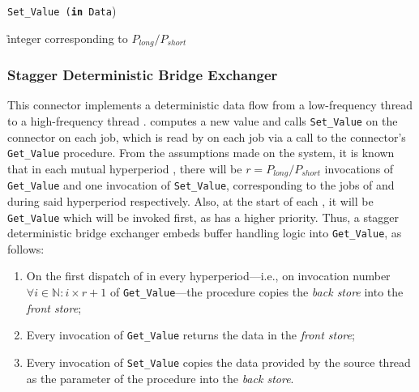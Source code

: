 \begin{algorithm}
\label{algo:stepper_write}
\caption{\texttt{Set\_Value (\textbf{in} Data})}
\r{integer corresponding to $P_{long}/P_{short}$}
\SetLine
{}
\end{algorithm}

\subsubsection{Stagger Deterministic Bridge Exchanger}
This connector implements a deterministic data flow from a
low-frequency thread \tl to a high-frequency thread \ts. \tl computes
a new value and calls \texttt{Set\_Value} on the connector on each
job, which is read by \ts on each job via a call to the connector's
\texttt{Get\_Value} procedure. From the assumptions made on the
system, it is known that in each mutual hyperperiod \plong, there will
be $r=P_{long}/P_{short}$ invocations of \texttt{Get\_Value} and one
invocation of \texttt{Set\_Value}, corresponding to the jobs of \tl
and \ts during said hyperperiod respectively. Also, at the start of
each \plong, it will be \texttt{Get\_Value} which will be invoked
first, as \ts has a higher priority. Thus, a stagger deterministic
bridge exchanger embeds buffer handling logic into
\texttt{Get\_Value}, as follows:

\begin{enumerate}
\item{On the first dispatch of \ts in every hyperperiod---i.e., on
  invocation number $\forall i\in\mathbb{N}:i\times r+1$ of
  \texttt{Get\_Value}---the procedure copies the \emph{back store} into the
  \emph{front store};}
\item{Every invocation of \texttt{Get\_Value} returns the data in the
  \emph{front store};}
\item{Every invocation of \texttt{Set\_Value} copies the data provided
  by the source thread as the parameter of the procedure into the
  \emph{back store}.}
\end{enumerate}

